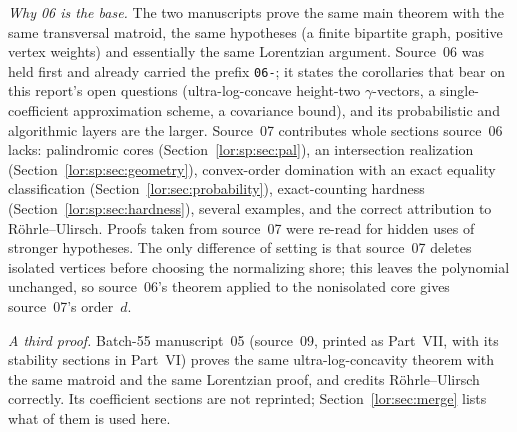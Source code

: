 \documentclass[11pt]{article}
\numberwithin{equation}{section}
\theoremstyle{definition}
\begin{document}
\emph{Why 06 is the base.} The two manuscripts prove the same main theorem
with the same transversal matroid, the same hypotheses (a finite bipartite
graph, positive vertex weights) and essentially the same Lorentzian
argument. Source~06 was held first and already carried the prefix
\texttt{06-}; it states the corollaries that bear on this report's open
questions (ultra-log-concave height-two $\gamma$-vectors, a single-coefficient
approximation scheme, a covariance bound), and its probabilistic and
algorithmic layers are the larger. Source~07 contributes whole sections
source~06 lacks: palindromic cores (Section~\ref{lor:sp:sec:pal}), an
intersection realization (Section~\ref{lor:sp:sec:geometry}), convex-order
domination with an exact equality classification
(Section~\ref{lor:sec:probability}), exact-counting hardness
(Section~\ref{lor:sp:sec:hardness}), several examples, and the correct
attribution to R\"ohrle--Ulirsch. Proofs taken from source~07 were re-read
for hidden uses of stronger hypotheses. The only difference of setting is
that source~07 deletes isolated vertices before choosing the normalizing
shore; this leaves the polynomial unchanged, so source~06's theorem applied
to the nonisolated core gives source~07's order~$d$.

\emph{A third proof.} Batch-55 manuscript~05 (source~09, printed as
Part~VII, with its stability sections in Part~VI) proves the same
ultra-log-concavity theorem with the same matroid and the same Lorentzian
proof, and credits R\"ohrle--Ulirsch correctly. Its coefficient sections are
not reprinted; Section~\ref{lor:sec:merge} lists what of them is used here.
\end{document}

